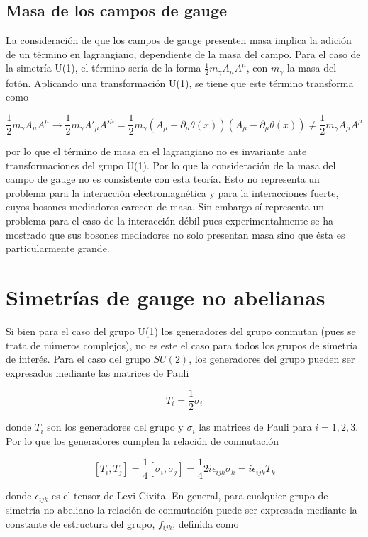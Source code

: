 \subsection{Masa de los campos de gauge}

La consideración de que los campos de gauge presenten masa implica la adición de un término en lagrangiano, dependiente de la masa del campo. Para el caso de la simetría U(1), el término sería de la forma $\frac{1}{2}m_{\gamma}A_{\mu}A^{\mu}$, con $m_{\gamma}$ la masa del fotón. Aplicando una transformación U(1), se tiene que este término transforma como

$$ \frac{1}{2}m_{\gamma}A_{\mu}A^{\mu} \longrightarrow \frac{1}{2}m_{\gamma}A'_{\mu}A'^{\mu} = \frac{1}{2}m_{\gamma}(A_{\mu} - \partial_{\mu}\theta(x))(A_{\mu} - \partial_{\mu}\theta(x)) \neq \frac{1}{2}m_{\gamma}A_{\mu}A^{\mu} $$

por lo que el término de masa en el lagrangiano no es invariante ante transformaciones del grupo U(1). Por lo que la consideración de la masa del campo de gauge no es consistente con esta teoría. Esto no representa un problema para la interacción electromagnética y para la interacciones fuerte, cuyos bosones mediadores carecen de masa. Sin embargo sí representa un problema para el caso de la interacción débil pues experimentalmente se ha mostrado que sus bosones mediadores no solo presentan masa sino que ésta es particularmente grande. 

\section{Simetrías de gauge no abelianas}

Si bien para el caso del grupo U(1) los generadores del grupo conmutan (pues se trata de números complejos), no es este el caso para todos los grupos de simetría de interés. Para el caso del grupo $SU(2)$, los generadores del grupo pueden ser expresados mediante las matrices de Pauli

$$ T_i = \frac{1}{2}\sigma_i $$

donde $T_i$ son los generadores del grupo y $\sigma_i$ las matrices de Pauli para $i=1,2,3$. Por lo que los generadores cumplen la relación de conmutación

$$ [T_i, T_j] = \frac{1}{4}[\sigma_i, \sigma_j] = \frac{1}{4}2i\epsilon_{ijk}\sigma_k = i\epsilon_{ijk}T_k $$

donde $\epsilon_{ijk}$ es el tensor de Levi-Civita. En general, para cualquier grupo de simetría no abeliano la relación de conmutación puede ser expresada mediante la constante de estructura del grupo, $f_{ijk}$, definida como 

